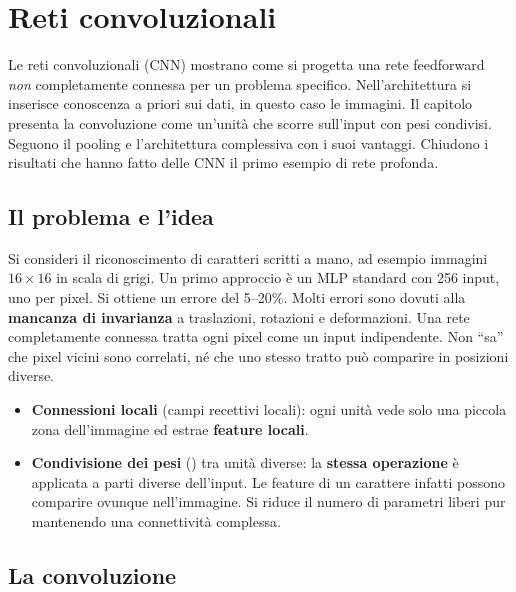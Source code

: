 \chapter{Reti convoluzionali}
\label{cap:cnn}

\begin{inbreve}
Le reti convoluzionali (CNN) mostrano come si progetta una rete feedforward \emph{non} completamente connessa per
un problema specifico. Nell'architettura si inserisce conoscenza a priori sui dati, in questo caso le immagini. Il
capitolo presenta la convoluzione come un'unità che scorre sull'input con pesi condivisi. Seguono il pooling e
l'architettura complessiva con i suoi vantaggi. Chiudono i risultati che hanno fatto delle CNN il primo esempio di
rete profonda.
\end{inbreve}

\section{Il problema e l'idea}

Si consideri il riconoscimento di caratteri scritti a mano, ad esempio immagini $16\times16$ in scala di grigi. Un
primo approccio è un MLP standard con 256 input, uno per pixel. Si ottiene un errore del 5--20\%. Molti errori sono
dovuti alla \textbf{mancanza di invarianza} a traslazioni, rotazioni e deformazioni. Una rete completamente
connessa tratta ogni pixel come un input indipendente. Non ``sa'' che pixel vicini sono correlati, né che uno
stesso tratto può comparire in posizioni diverse.

\begin{idea}
\begin{itemize}
  \item \textbf{Connessioni locali} (campi recettivi locali): ogni unità vede solo una piccola zona dell'immagine ed
        estrae \textbf{feature locali}.
  \item \textbf{Condivisione dei pesi} () tra unità diverse: la \textbf{stessa operazione} è
        applicata a parti diverse dell'input. Le feature di un carattere infatti possono comparire ovunque
        nell'immagine. Si riduce il numero di parametri liberi pur mantenendo una connettività complessa.
\end{itemize}
\end{idea}

\section{La convoluzione}

